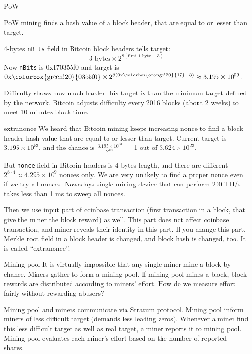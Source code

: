 \documentclass[10pt]{beamer}
\begin{document}
\begin{frame}[fragile]{PoW}

PoW mining finds a hash value of a block header, that are equal to or
lesser than target.

\setlength{\fboxsep}{1pt}
4-bytes \texttt{nBits} field in Bitcoin block headers tells target:
\[\text{3-bytes} \times 2^{8 (\text{first 1-byte} - 3)}\]
Now \texttt{nBits} is 0x\colorbox{orange!20}{17}\colorbox{green!20}{0355f0}
and target is $\text{0x\colorbox{green!20}{0355f0}} \times 2^{8 (\text{0x\colorbox{orange!20}{17}} - 3)} \approx 3.195 \times 10^{53}$.

Difficulty shows how much harder this target is than the minimum target
defined by the network. Bitcoin adjusts difficulty every 2016 blocks
(about 2 weeks) to meet 10 minutes block time.
\end{frame}

\begin{frame}[fragile]{extranonce}
We heard that Bitcoin mining keeps increasing nonce to find a block header
hash value that are equal to or lesser than target. Current target is
$3.195 \times 10^{53}$, and the chance is
$\frac{3.195 \times 10^{53}}{2^{256}} =$ 1 out of $3.624 \times 10^{23}$.

But \texttt{nonce} field in Bitcoin headers is 4 bytes length, and there
are different $2^{8 \cdot 4} \approx 4.295 \times 10^9$ nonces only.
We are very unlikely to find a proper nonce even if we try all nonces.
Nowadays single mining device that can perform 200 TH/s takes less than
1 ms to sweep all nonces.

Then we use input part of coinbase transaction (first transaction in
a block, that give the miner the block reward) as well. This part does
not affect coinbase transaction, and miner reveals their identity in
this part. If you change this part, Merkle root field in a block header
is changed, and block hash is changed, too. It is called ``extranonce''.
\end{frame}

\begin{frame}[fragile]{Mining pool}
It is virtually impossible that any single miner mine a block by chance.
Miners gather to form a mining pool. If mining pool mines a block,
block rewards are distributed according to miners' effort.
How do we measure effort fairly without rewarding abusers?

Mining pool and miners communicate via Stratum protocol. Mining pool
inform miners of less difficult target (demands less leading zeros).
Whenever a miner find this less difficult target as well as real target,
a miner reports it to mining pool. Mining pool evaluates each miner's
effort based on the number of reported shares.
\end{frame}
\end{document}
